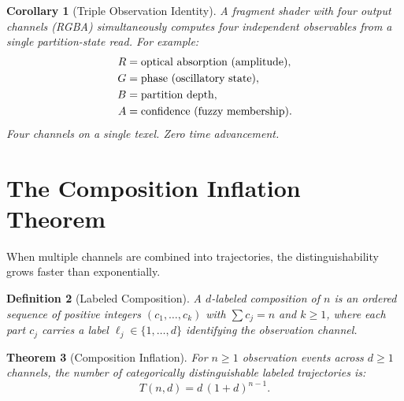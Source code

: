 \documentclass[11pt,twocolumn,a4paper]{article}
\newtheorem{theorem}{Theorem}[section]
\newtheorem{corollary}[theorem]{Corollary}
\newtheorem{definition}[theorem]{Definition}
\begin{document}
\begin{corollary}[Triple Observation Identity]
\label{cor:triple-observation}
A fragment shader with four output channels (RGBA) simultaneously
computes four independent observables from a single partition-state
read.  For example:
\begin{align}
  R &= \text{optical absorption (amplitude)}, \notag \\
  G &= \text{phase (oscillatory state)}, \notag \\
  B &= \text{partition depth}, \notag \\
  A &= \text{confidence (fuzzy membership)}.
  \label{eq:rgba-observables}
\end{align}
Four channels on a single texel.  Zero time advancement.
\end{corollary}


\section{The Composition Inflation Theorem}
\label{sec:composition-inflation}

When multiple channels are combined into trajectories, the
distinguishability grows faster than exponentially.

\begin{definition}[Labeled Composition]
\label{def:labeled-composition}
A \emph{$d$-labeled composition of $n$} is an ordered sequence of
positive integers $(c_1, \ldots, c_k)$ with $\sum c_j = n$ and
$k \geq 1$, where each part $c_j$ carries a label
$\ell_j \in \{1, \ldots, d\}$ identifying the observation channel.
\end{definition}

\begin{theorem}[Composition Inflation]
\label{thm:composition-inflation}
For $n \geq 1$ observation events across $d \geq 1$ channels, the
number of categorically distinguishable labeled trajectories is:
\begin{equation}
  T(n, d) = d\,(1 + d)^{n-1}.
  \label{eq:inflation}
\end{equation}
\end{theorem}
\end{document}
